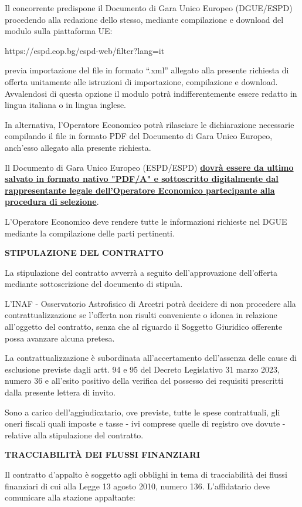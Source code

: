 Il concorrente predispone il Documento di Gara Unico Europeo (DGUE/ESPD)
procedendo alla redazione dello stesso, mediante compilazione e download 
del modulo sulla piattaforma UE:

https://espd.eop.bg/espd-web/filter?lang=it

previa importazione del file in formato “.xml” allegato alla presente
richiesta di offerta unitamente alle istruzioni di importazione,
compilazione e download. Avvalendosi di questa opzione il modulo potrà
indifferentemente essere redatto in lingua italiana o in lingua inglese. 

In alternativa, l'Operatore Economico potrà rilasciare le dichiarazione
necessarie compilando il  file in formato PDF del Documento di Gara Unico
Europeo, anch'esso allegato alla presente richiesta.

Il Documento di Gara Unico Europeo (ESPD/ESPD) \textbf{\ul{dovr\`a
essere da ultimo salvato in formato nativo "PDF/A" e sottoscritto
digitalmente dal rappresentante legale dell'Operatore Economico
partecipante alla procedura di selezione}}.

L'Operatore Economico deve rendere tutte le informazioni richieste
nel DGUE mediante la compilazione delle parti pertinenti.

\textbf{STIPULAZIONE DEL CONTRATTO}

La stipulazione del contratto avverrà a seguito dell'approvazione
dell'offerta mediante sottoscrizione del documento di stipula.

L'INAF - Osservatorio Astrofisico di Arcetri potrà decidere di non
procedere alla contrattualizzazione se l'offerta non risulti conveniente
o idonea in relazione all'oggetto del contratto, senza che al riguardo
il Soggetto Giuridico offerente possa avanzare alcuna pretesa.

La contrattualizzazione è subordinata all'accertamento dell'assenza
delle cause di esclusione previste dagli artt. 94 e 95 del Decreto
Legislativo 31 marzo 2023, numero 36 e all'esito positivo della verifica
del possesso dei requisiti prescritti dalla presente lettera di invito.

Sono a carico dell'aggiudicatario, ove previste, tutte le spese
contrattuali, gli oneri fiscali quali imposte e tasse - ivi comprese
quelle di registro ove dovute - relative alla stipulazione del contratto.

\textbf{TRACCIABILITÀ DEI FLUSSI FINANZIARI}

Il contratto d'appalto è soggetto agli obblighi in tema di
tracciabilità dei flussi finanziari di cui alla Legge 13 agosto 2010,
numero 136. L'affidatario deve comunicare alla stazione appaltante:

